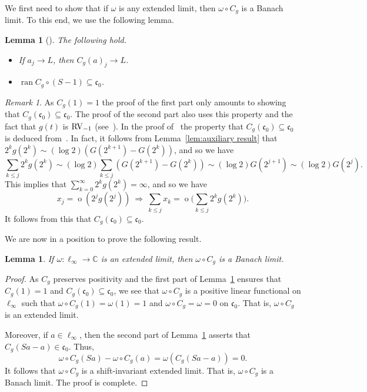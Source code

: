 \documentclass[10pt, a4paper]{amsart}
\newcommand{\C}{\mathbb{C}}
\newcommand{\co}{\mathfrak{c}_{0}}
\newcommand{\op}{\operatorname}
\newcommand{\ran}{\op{ran}}
\numberwithin{equation}{section}
\newtheorem{lemma}[theorem]{Lemma}
\theoremstyle{definition}
\theoremstyle{remark}
\newtheorem{remark}[theorem]{Remark}
\newcommand{\RV}{\textup{RV}}
\begin{document}
We first need to show that if $\omega$ is any extended limit, then $\omega\circ C_g$ is a Banach limit. To this end, we use the following lemma.

\begin{lemma}[{\cite[Proposition~4.5]{LU:JMAA25}}]\label{lem:regular summation}
The following hold.
 \begin{itemize}
 \item[(i)]  If $a_j \rightarrow L$, then $C_g(a)_j \rightarrow L$.

 \item[(ii)] $\ran C_g\circ (S-1)\subseteq \co$.
\end{itemize}
\end{lemma}

\begin{remark}
 As $C_g(1)=1$ the proof of the first part only amounts to showing that $C_g(\co)\subseteq \co$. The proof of the second part also uses this property and the fact that $g(t)$ is $\RV_{-1}$ (see~\cite{LU:JMAA25}). In the proof of~\cite[Proposition~4.5]{LU:JMAA25} the property that $C_g(\co)\subseteq \co$ is deduced
  from~\cite[Theorem~3.2.7]{BC:Oxford00}. In fact, it follows from Lemma~\ref{lem:auxiliary result} that  $2^kg(2^k)\sim (\log 2) (G(2^{k+1})-G(2^k))$, and so we have
  \begin{equation}\label{eq:lacunary partial sum}
\sum_{k\leq j} 2^kg(2^k) \sim (\log 2)\sum_{k\leq j} \left(G(2^{k+1})-G(2^k)\right)\sim (\log 2) G(2^{j+1})\sim (\log 2) G(2^j).
\end{equation}
This implies that $\sum_{k=0}^\infty 2^kg(2^k)=\infty$, and so we have
 \begin{equation*}
 x_j = \op{o}\left(2^jg(2^j)\right) \ \Longrightarrow \ \sum_{k\leq j} x_k = \op{o}\bigg(\sum_{k\leq j} 2^kg(2^k)\bigg).
\end{equation*}
It follows from this that $C_g(\co)\subseteq \co$.
 \end{remark}

We are now in a position to prove the following result.

\begin{lemma}\label{lem:Cesaro -banach}
 If $\omega:\ell_\infty \rightarrow \C$ is an extended limit, then $\omega\circ C_g$ is a Banach limit.
\end{lemma}
\begin{proof}
As $C_g$ preserves positivity and the first part of Lemma~\ref{lem:regular summation} ensures that $C_g(1)=1$ and $C_g(\co)\subseteq \co$, we see that $\omega \circ C_g$ is a positive linear functional on $\ell_\infty$ such that $\omega \circ C_g(1)=\omega(1)=1$ and $\omega\circ C_g=\omega=0$ on $\co$. That is, $\omega \circ C_g$ is an extended limit.

Moreover, if $a\in\ell_\infty$, then the second part of Lemma~\ref{lem:regular summation} asserts that $C_g(Sa-a)\in\co$. Thus,
\begin{equation*}
 \omega\circ C_g (Sa)- \omega\circ C_g (a)=\omega\left( C_g(Sa-a)\right)=0.
\end{equation*}
It follows that $\omega \circ C_g$ is a shift-invariant extended limit. That is, $\omega \circ C_g$ is a Banach limit. The proof is complete.
\end{proof}
\end{document}
